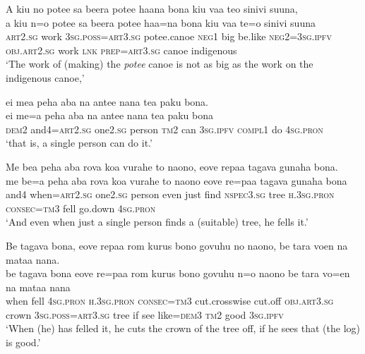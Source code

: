 \ea\label{ex:text18-5}
A kiu no potee sa beera potee haana bona kiu vaa teo sinivi suuna,\\
\gll a	kiu	n=o	potee	sa	beera	potee	haa=na	bona	kiu	vaa	te=o	sinivi	suuna\\
     \textsc{art}2.\textsc{sg}	work	3\textsc{sg}.\textsc{poss}=\textsc{art}3.\textsc{sg}	potee.canoe	\textsc{neg}1	big	be.like	\textsc{neg}2=3\textsc{sg}.\textsc{ipfv}	\textsc{obj}.\textsc{art}2.\textsc{sg}	work	\textsc{lnk}	\textsc{prep}=\textsc{art}3.\textsc{sg}	canoe	indigenous\\
\glt `The work of (making) the \textit{potee} canoe is not as big as the work on the indigenous canoe,'
\z\clearpage

\ea\label{ex:text18-6}
ei mea peha aba na antee nana tea paku bona.\\
\gll ei	me=a	peha	aba	na	antee	nana	tea	paku	bona\\
     \textsc{dem}2	and4=\textsc{art}2.\textsc{sg}	one2.\textsc{sg}	person	\textsc{tm}2	can	3\textsc{sg}.\textsc{ipfv}	\textsc{compl}1	do	4\textsc{sg}.\textsc{pron}\\
\glt `that is, a single person can do it.'
\z

\ea\label{ex:text18-7}
Me bea peha aba rova koa vurahe to naono, eove repaa tagava gunaha bona.\\
\gll me	be=a	peha	aba	rova	koa	vurahe	to	naono	eove	re=paa	tagava	gunaha	bona\\
     and4	when=\textsc{art}2.\textsc{sg}	one2.\textsc{sg}	person	even	just	find	\textsc{nspec}3.\textsc{sg}	tree	\textsc{h}.3\textsc{sg}.\textsc{pron}	\textsc{consec}=\textsc{tm}3	fell	go.down	4\textsc{sg}.\textsc{pron}\\
\glt `And even when just a single person finds a (suitable) tree, he fells it.'
\z

\ea\label{ex:text18-8}
Be tagava bona, eove repaa rom kurus bono govuhu no naono, be tara voen na mataa nana.\\
\gll be	tagava	bona	eove	re=paa	rom	kurus	bono	govuhu	n=o	naono	be	tara	vo=en	na	mataa	nana\\
     when	fell	4\textsc{sg}.\textsc{pron}	\textsc{h}.3\textsc{sg}.\textsc{pron}	\textsc{consec}=\textsc{tm}3	cut.crosswise	cut.off	\textsc{obj}.\textsc{art}3.\textsc{sg}	crown	3\textsc{sg}.\textsc{poss}=\textsc{art}3.\textsc{sg}	tree	if	see	like=\textsc{dem}3	\textsc{tm}2	good	3\textsc{sg}.\textsc{ipfv}\\
\glt `When (he) has felled it, he cuts the crown of the tree off, if he sees that (the log) is good.'
\z

